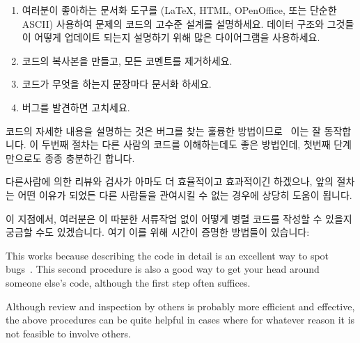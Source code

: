 \begin{enumerate}
\item	여러분이 좋아하는 문서화 도구를 (\LaTeX{}, HTML, OPenOffice, 또는
	단순한 ASCII) 사용하여 문제의 코드의 고수준 설계를 설명하세요.
	데이터 구조와 그것들이 어떻게 업데이트 되는지 설명하기 위해 많은
	다이어그램을 사용하세요.
\item	코드의 복사본을 만들고, 모든 코멘트를 제거하세요.
\item	코드가 무엇을 하는지 문장마다 문서화 하세요.
\item	버그를 발견하면 고치세요.

\end{enumerate}

코드의 자세한 내용을 설명하는 것은 버그를 찾는 훌륭한
방법이므로~\cite{GlenfordJMyers1979} 이는 잘 동작합니다.
이 두번째 절차는 다른 사람의 코드를 이해하는데도 좋은 방법인데, 첫번째
단계만으로도 종종 충분하긴 합니다.

다른사람에 의한 리뷰와 검사가 아마도 더 효율적이고 효과적이긴 하겠으나, 앞의
절차는 어떤 이유가 되었든 다른 사람들을 관여시킬 수 없는 경우에 상당히 도움이
됩니다.

이 지점에서, 여러분은 이 따분한 서류작업 없이 어떻게 병렬 코드를 작성할 수
있을지 궁금할 수도 있겠습니다.
여기 이를 위해 시간이 증명한 방법들이 있습니다:

\iffalse

This works because describing the code in detail is an excellent way to spot
bugs~\cite{GlenfordJMyers1979}.
This second procedure is also a good way to get your head around
someone else's code, although the first step often suffices.

Although review and inspection by others is probably more efficient and
effective, the above procedures can be quite helpful in cases where
for whatever reason it is not feasible to involve others.

